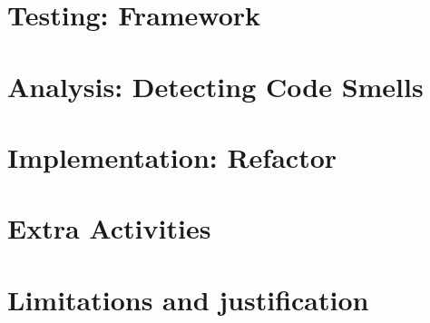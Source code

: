\section{Testing: Framework}

\section{Analysis: Detecting Code Smells}

\section{Implementation: Refactor}

\section{Extra Activities}

\section{Limitations and justification}
